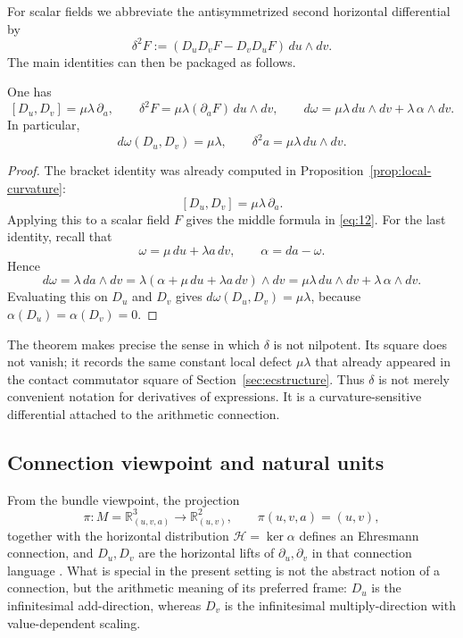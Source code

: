 For scalar fields we abbreviate the antisymmetrized second horizontal differential by
\[
\delta^2F:=(D_uD_vF-D_vD_uF)\,du\wedge dv.
\]
The main identities can then be packaged as follows.

\begin{theorem}\label{thm:delta_fundamental_package}
One has
\begin{equation}\label{eq:12}\tag{12}
[D_u,D_v]=\mu\lambda\,\partial_a,
\qquad
\delta^2F=\mu\lambda(\partial_aF)\,du\wedge dv,
\qquad
d\omega=\mu\lambda\,du\wedge dv+\lambda\,\alpha\wedge dv.
\end{equation}
In particular,
\[
d\omega(D_u,D_v)=\mu\lambda,
\qquad
\delta^2a=\mu\lambda\,du\wedge dv.
\]
\end{theorem}

\begin{proof}
The bracket identity was already computed in Proposition~\ref{prop:local-curvature}:
\[
[D_u,D_v]=\mu\lambda\,\partial_a.
\]
Applying this to a scalar field $F$ gives the middle formula in \eqref{eq:12}. For the last identity, recall that
\[
\omega=\mu\,du+\lambda a\,dv,
\qquad
\alpha=da-\omega.
\]
Hence
\[
d\omega=\lambda\,da\wedge dv
=\lambda(\alpha+\mu\,du+\lambda a\,dv)\wedge dv
=\mu\lambda\,du\wedge dv+\lambda\,\alpha\wedge dv.
\]
Evaluating this on $D_u$ and $D_v$ gives $d\omega(D_u,D_v)=\mu\lambda$, because $\alpha(D_u)=\alpha(D_v)=0$.
\end{proof}

The theorem makes precise the sense in which $\delta$ is not nilpotent. Its square does not vanish; it records the same constant local defect $\mu\lambda$ that already appeared in the contact commutator square of Section~\ref{sec:ecstructure}. Thus $\delta$ is not merely convenient notation for derivatives of expressions. It is a curvature-sensitive differential attached to the arithmetic connection.

\subsection{Connection viewpoint and natural units}

From the bundle viewpoint, the projection
\[
\pi:M=\mathbb{R}^3_{(u,v,a)}\longrightarrow \mathbb{R}^2_{(u,v)},
\qquad
\pi(u,v,a)=(u,v),
\]
together with the horizontal distribution $\mathcal H=\ker\alpha$ defines an Ehresmann connection, and $D_u,D_v$ are the horizontal lifts of $\partial_u,\partial_v$ in that connection language \cite{KobayashiNomizu1963FDG1}. What is special in the present setting is not the abstract notion of a connection, but the arithmetic meaning of its preferred frame: $D_u$ is the infinitesimal add-direction, whereas $D_v$ is the infinitesimal multiply-direction with value-dependent scaling.

